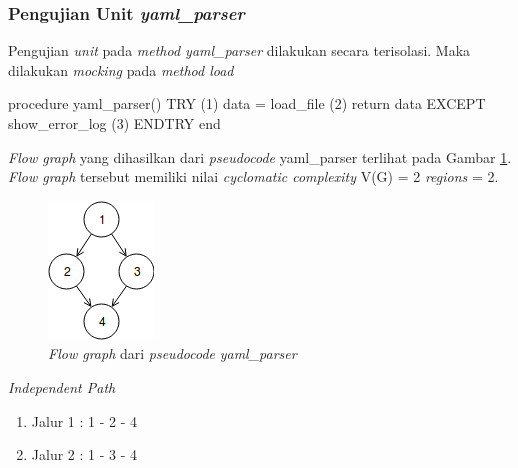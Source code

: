 \subsubsection{Pengujian Unit \emph{yaml\_parser}}

Pengujian \emph{unit} pada \emph{method yaml\_parser} dilakukan secara
terisolasi. Maka dilakukan \emph{mocking} pada \emph{method load} \\

\begin{code}
\begin{ignasicblock}[title=yaml\_parser,minted language=text]
procedure yaml_parser()
    TRY                             (1)
        data = load_file            (2)
        return data
    EXCEPT
        show_error_log              (3)
    ENDTRY
end
\end{ignasicblock}
\label{pc:yaml_parser}
\end{code}

\par\null\par
\noindent
\emph{Flow graph} yang dihasilkan dari \emph{pseudocode}
yaml\_parser terlihat pada Gambar \ref{cfg:yaml_parser}. \emph{Flow graph} tersebut memiliki
nilai \emph{cyclomatic complexity} V(G) = 2 \emph{regions}  = 2.

\begin{figure}[H]
  \centering
  \includegraphics[width=.17\linewidth]{img/test-case/attach-c} %
  \caption{\emph{Flow graph} dari \emph{pseudocode} \emph{yaml\_parser}}
  \label{cfg:yaml_parser}
\end{figure}

\noindent
\emph{Independent Path}

\begin{enumerate}
\item Jalur 1 : 1 - 2 - 4
\item Jalur 2 : 1 - 3 - 4
\end{enumerate}

